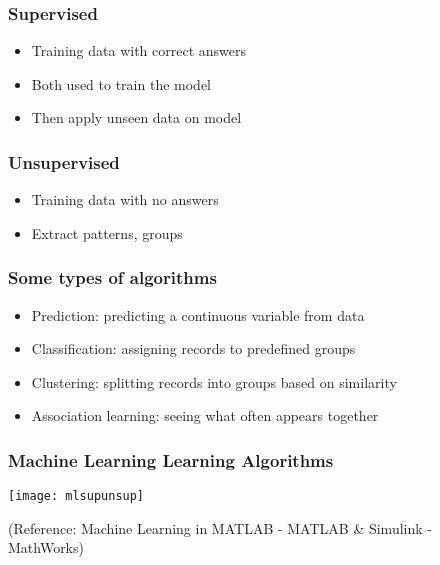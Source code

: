 \begin{frame}[fragile]\frametitle{Supervised}
	\begin{itemize}
	\item Training data with correct answers
	\item Both used to train the model
	\item Then apply unseen data on model
	\end{itemize}
\end{frame}
\begin{frame}[fragile]\frametitle{Unsupervised}
	\begin{itemize}
	\item Training data with no answers
	\item Extract patterns, groups
	\end{itemize}	

\end{frame}

\begin{frame}[fragile]\frametitle{Some types of algorithms}
\begin{itemize}
\item Prediction: predicting a continuous variable from data
\item Classification: assigning records to predefined groups
\item Clustering: splitting records into groups based on similarity
\item Association learning: seeing what often appears together
\end{itemize}

\end{frame}

\begin{frame}[fragile]\frametitle{Machine Learning Learning Algorithms}
\begin{center}
\texttt{[image: mlsupunsup]}
\end{center}
\tiny{(Reference: Machine Learning in MATLAB - MATLAB \& Simulink - MathWorks)}
\end{frame}

